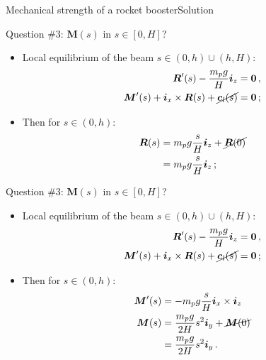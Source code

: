 \documentclass{beamer}
\newcommand{\cj}{c}
\newcommand{\cv}{{\boldsymbol\cj}}
\newcommand{\xj}{x}
\newcommand{\yj}{y}
\newcommand{\zj}{z}
\renewcommand{\ij}{i}
\newcommand{\iv}{{\boldsymbol\ij}}
\newcommand{\Fresj}{R}
\newcommand{\Mresj}{M}
\newcommand{\Fres}{{\boldsymbol\Fresj}}
\newcommand{\Mres}{{\boldsymbol\Mresj}}
\newcommand{\bzero}{{\bf 0}}
\begin{document}
\begin{frame}{Mechanical strength of a rocket booster}{Solution}
\begin{overprint}
\vskip-20pt
\begin{exampleblock}{Question \#3: $\Mres(s)$ in $s\in[0,H]$?}
\begin{itemize}
\item Local equilibrium of the beam $s\in(0,h)\cup(h,H)$:
\begin{displaymath}
\begin{split}
\Fres'(s)-\frac{m_p g}{H}\iv_\zj &=\bzero\,, \\
\Mres'(s)+\iv_\xj\times\Fres(s)+\cancel{\cv_l(s)} &=\bzero\,;
\end{split}
\end{displaymath}
\item Then for $s\in(0,h)$:
\begin{displaymath}
\begin{split}
\Fres(s) &=m_p g\frac{s}{H}\iv_\zj+\cancel{\Fres(0)}  \\
&=m_p g\frac{s}{H}\iv_\zj\,;
\end{split}
\end{displaymath}
\end{itemize}
\end{exampleblock}

\vskip-20pt
\begin{exampleblock}{Question \#3: $\Mres(s)$ in $s\in[0,H]$?}
\begin{itemize}
\item Local equilibrium of the beam $s\in(0,h)\cup(h,H)$:
\begin{displaymath}
\begin{split}
\Fres'(s)-\frac{m_p g}{H}\iv_\zj &=\bzero\,, \\
\Mres'(s)+\iv_\xj\times\Fres(s)+\cancel{\cv_l(s)} &=\bzero\,;
\end{split}
\end{displaymath}
\item Then for $s\in(0,h)$:
\begin{displaymath}
\begin{split}
\Mres'(s) &=-m_p g\frac{s}{H}\iv_\xj\times\iv_\zj \\
\Mres(s) &=\frac{m_p g}{2H}s^2\iv_\yj +\cancel{\Mres(0)} \\
&=\frac{m_p g}{2H}s^2\iv_\yj \,.
\end{split}
\end{displaymath}
\end{itemize}
\end{exampleblock}


\end{overprint}
\end{frame}
\end{document}

